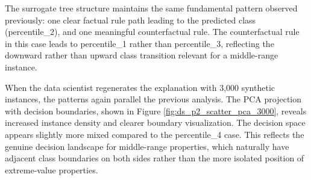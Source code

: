 The surrogate tree structure maintains the same fundamental pattern observed previously: one clear factual rule path leading to the predicted class (percentile\_2), and one meaningful counterfactual rule. The counterfactual rule in this case leads to percentile\_1 rather than percentile\_3, reflecting the downward rather than upward class transition relevant for a middle-range instance. 

When the data scientist regenerates the explanation with 3,000 synthetic instances, the patterns again parallel the previous analysis. The PCA projection with decision boundaries, shown in Figure \ref{fig:ds_p2_scatter_pca_3000}, reveals increased instance density and clearer boundary visualization. The decision space appears slightly more mixed compared to the percentile\_4 case. This reflects the genuine decision landscape for middle-range properties, which naturally have adjacent class boundaries on both sides rather than the more isolated position of extreme-value properties.

